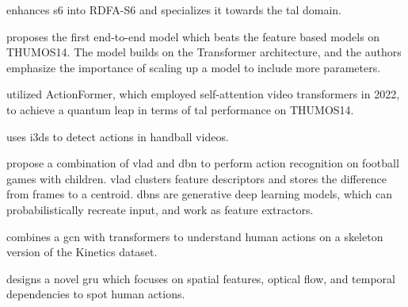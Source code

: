 \textcite{lee_enhancing_mamba_s6_2024} enhances \acrshort{s6} into RDFA-S6 and specializes it towards the \acrshort{tal} domain. 

\textcite{liu_adatad_2024} proposes the first end-to-end model which beats the feature based models on THUMOS14. The model builds on the Transformer architecture, and the authors emphasize the importance of scaling up a model to include more parameters. 

\textcite{zhang_actionformer_2022} utilized ActionFormer, which employed self-attention video transformers in 2022, to achieve a quantum leap in terms of \acrshort{tal} performance on THUMOS14. 

\textcite{host_handball_2023} uses \acrlong{i3d}s to detect actions in handball videos. 

\textcite{chen_children_2023} propose a combination of \acrfull{vlad} and \acrfull{dbn} to perform action recognition on football games with children. \acrshort{vlad} clusters feature descriptors and stores the difference from frames to a centroid\cite{jegou_vlad_2010}. \acrshort{dbn}s are generative deep learning models, which can probabilistically recreate input, and work as feature extractors\cite{hinton_dbn_2006}.

\textcite{wang_skeleton_two-stream_2023} combines a \acrfull{gcn} with transformers to understand human actions on a skeleton version of the Kinetics dataset.  

\textcite{giveki_human_2024} designs a novel \acrshort{gru} which focuses on spatial features, optical flow, and temporal dependencies to spot human actions. 
 




